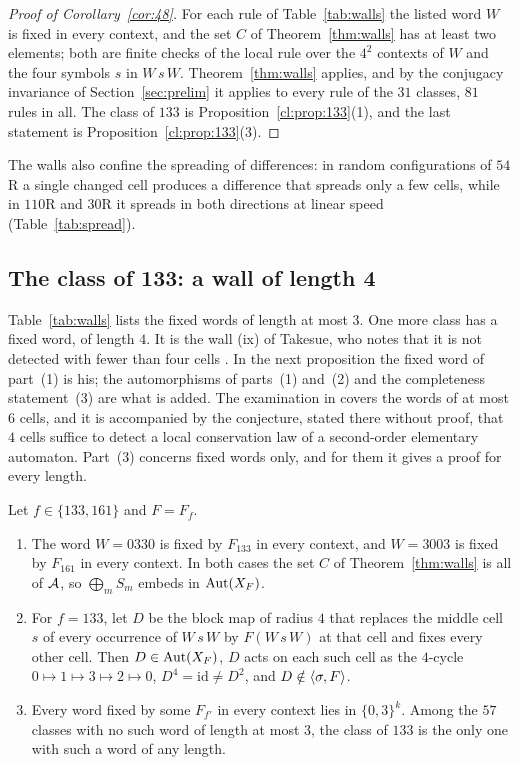 \begin{proof}[Proof of Corollary~\ref{cor:48}]
For each rule of Table~\ref{tab:walls} the listed word $W$ is fixed in every context, and the set $C$ of Theorem~\ref{thm:walls} has at least two elements; both are finite checks of the local rule over the $4^2$ contexts of $W$ and the four symbols $s$ in $W\,s\,W$. Theorem~\ref{thm:walls} applies, and by the conjugacy invariance of Section~\ref{sec:prelim} it applies to every rule of the $31$ classes, $81$ rules in all. The class of $133$ is Proposition~\ref{cl:prop:133}(1), and the last statement is Proposition~\ref{cl:prop:133}(3).
\end{proof}

The walls also confine the spreading of differences: in random configurations of $54$R a single changed cell produces a difference that spreads only a few cells, while in $110$R and $30$R it spreads in both directions at linear speed (Table~\ref{tab:spread}).

\subsection{The class of 133: a wall of length 4}\label{cl:sec:133}

Table~\ref{tab:walls} lists the fixed words of length at most $3$. One more class has a fixed word, of length $4$. It is the wall (ix) of Takesue, who notes that it is not detected with fewer than four cells \cite[Table~III and p.~391]{Takesue1989}. In the next proposition the fixed word of part~(1) is his; the automorphisms of parts~(1) and~(2) and the completeness statement~(3) are what is added. The examination in \cite[Section~4]{Takesue1989} covers the words of at most $6$ cells, and it is accompanied by the conjecture, stated there without proof, that $4$ cells suffice to detect a local conservation law of a second-order elementary automaton. Part~(3) concerns fixed words only, and for them it gives a proof for every length.

\begin{proposition}\label{cl:prop:133}
Let $f\in\{133,161\}$ and $F=F_f$.
\begin{enumerate}
\item The word $W=0330$ is fixed by $F_{133}$ in every context, and $W=3003$ is fixed by $F_{161}$ in every context. In both cases the set $C$ of Theorem~\ref{thm:walls} is all of $\mathcal{A}$, so $\bigoplus_mS_m$ embeds in $\operatorname{Aut}(X_F)$.
\item For $f=133$, let $D$ be the block map of radius $4$ that replaces the middle cell $s$ of every occurrence of $W\,s\,W$ by $F(W\,s\,W)$ at that cell and fixes every other cell. Then $D\in\operatorname{Aut}(X_F)$, $D$ acts on each such cell as the $4$-cycle $0\mapsto1\mapsto3\mapsto2\mapsto0$, $D^4=\mathrm{id}\ne D^2$, and $D\notin\langle\sigma,F\rangle$.
\item Every word fixed by some $F_{f'}$ in every context lies in $\{0,3\}^k$. Among the $57$ classes with no such word of length at most $3$, the class of $133$ is the only one with such a word of any length.
\end{enumerate}
\end{proposition}

